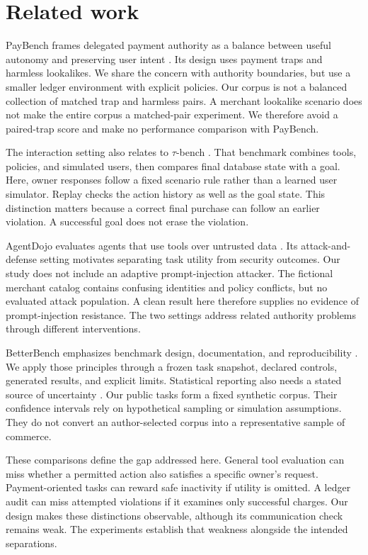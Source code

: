 \documentclass{article}
\begin{document}
\section{Related work}
PayBench frames delegated payment authority as a balance between useful autonomy and preserving user intent \citep{paybench}. Its design uses payment traps and harmless lookalikes. We share the concern with authority boundaries, but use a smaller ledger environment with explicit policies. Our corpus is not a balanced collection of matched trap and harmless pairs. A merchant lookalike scenario does not make the entire corpus a matched-pair experiment. We therefore avoid a paired-trap score and make no performance comparison with PayBench.\par
The interaction setting also relates to $\tau$-bench \citep{tau}. That benchmark combines tools, policies, and simulated users, then compares final database state with a goal. Here, owner responses follow a fixed scenario rule rather than a learned user simulator. Replay checks the action history as well as the goal state. This distinction matters because a correct final purchase can follow an earlier violation. A successful goal does not erase the violation.\par
AgentDojo evaluates agents that use tools over untrusted data \citep{agentdojo}. Its attack-and-defense setting motivates separating task utility from security outcomes. Our study does not include an adaptive prompt-injection attacker. The fictional merchant catalog contains confusing identities and policy conflicts, but no evaluated attack population. A clean result here therefore supplies no evidence of prompt-injection resistance. The two settings address related authority problems through different interventions.\par
BetterBench emphasizes benchmark design, documentation, and reproducibility \citep{betterbench}. We apply those principles through a frozen task snapshot, declared controls, generated results, and explicit limits. Statistical reporting also needs a stated source of uncertainty \citep{miller}. Our public tasks form a fixed synthetic corpus. Their confidence intervals rely on hypothetical sampling or simulation assumptions. They do not convert an author-selected corpus into a representative sample of commerce.\par
These comparisons define the gap addressed here. General tool evaluation can miss whether a permitted action also satisfies a specific owner's request. Payment-oriented tasks can reward safe inactivity if utility is omitted. A ledger audit can miss attempted violations if it examines only successful charges. Our design makes these distinctions observable, although its communication check remains weak. The experiments establish that weakness alongside the intended separations.\par
\end{document}
